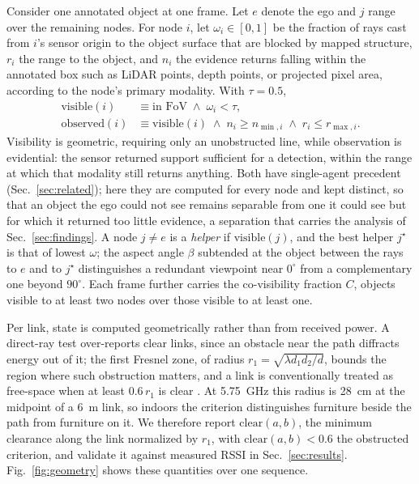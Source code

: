 \documentclass[journal]{IEEEtran}
\begin{document}
Consider one annotated object at one frame. Let $e$ denote the ego and
$j$ range over the remaining nodes. For node $i$, let
$\omega_i \in [0,1]$ be the fraction of rays cast from $i$'s sensor
origin to the object surface that are blocked by mapped structure,
$r_i$ the range to the object, and $n_i$ the evidence returns falling
within the annotated box such as LiDAR points, depth points, or
projected pixel area, according to the node's primary modality. With
$\tau = 0.5$,
%
\begin{align}
\mathrm{visible}(i) &\equiv \text{in FoV} \;\wedge\; \omega_i < \tau,
\label{eq:visible}\\
\mathrm{observed}(i) &\equiv \mathrm{visible}(i) \;\wedge\; n_i \ge n_{\min,i}
\;\wedge\; r_i \le r_{\max,i}.
\label{eq:observed}
\end{align}
%
Visibility is geometric, requiring only an unobstructed line, while
observation is evidential: the sensor returned support sufficient for
a detection, within the range at which that modality still returns
anything. Both have single-agent precedent (Sec.~\ref{sec:related});
here they are computed for every node and kept distinct, so that an
object the ego could not see remains separable from one it could see
but for which it returned too little evidence, a separation that
carries the analysis of Sec.~\ref{sec:findings}. A node $j \ne e$ is
a \emph{helper} if $\mathrm{visible}(j)$, and the best helper
$j^\star$ is that of lowest $\omega$; the aspect angle $\beta$
subtended at the object between the rays to $e$ and to $j^\star$
distinguishes a redundant viewpoint near $0^\circ$ from a
complementary one beyond $90^\circ$. Each frame further carries the
co-visibility fraction $C$, objects visible to at least two nodes over
those visible to at least one.

Per link, state is computed geometrically rather than from received
power. A direct-ray test over-reports clear links, since an obstacle
near the path diffracts energy out of it; the first Fresnel zone, of
radius $r_1 = \sqrt{\lambda d_1 d_2 / d}$, bounds the region where
such obstruction matters, and a link is conventionally treated as
free-space when at least $0.6\,r_1$ is clear \cite{itup530}. At
\SI{5.75}{\giga\hertz} this radius is \SI{28}{\centi\metre} at the
midpoint of a \SI{6}{\metre} link, so indoors the criterion
distinguishes furniture beside the path from furniture on it. We
therefore report $\mathrm{clear}(a,b)$, the minimum clearance along
the link normalized by $r_1$, with $\mathrm{clear}(a,b) < 0.6$ the
obstructed criterion, and validate it against measured RSSI in
Sec.~\ref{sec:results}. Fig.~\ref{fig:geometry} shows these
quantities over one sequence.
\end{document}

